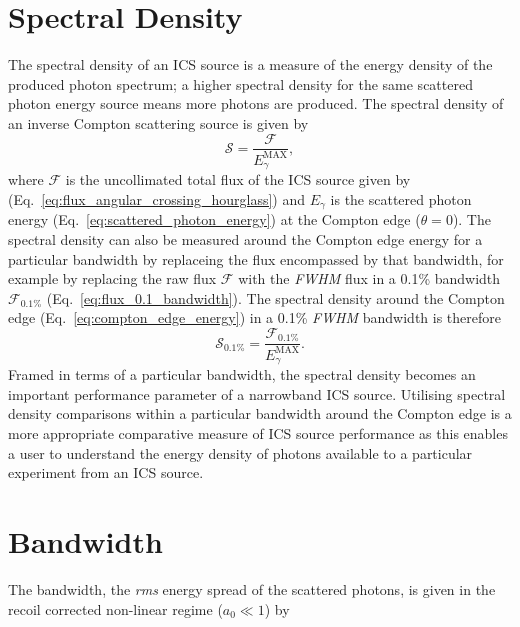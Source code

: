 \documentclass[../main.tex]{subfiles}
\begin{document}
\section{Spectral Density}

The spectral density of an ICS source is a measure of the energy density of the produced photon spectrum; a higher spectral density for the same scattered photon energy source means more photons are produced. The spectral density of an inverse Compton scattering source is given by
\begin{equation}
\mathcal{S} = \frac{\mathcal{F}}{E_{\gamma}^{\mathrm{MAX}}},
\label{eq:spectral_density}    
\end{equation}
where $\mathcal{F}$ is the uncollimated total flux of the ICS source given by (Eq.~\ref{eq:flux_angular_crossing_hourglass}) and $E_{\gamma}$ is the scattered photon energy (Eq.~\ref{eq:scattered_photon_energy}) at the Compton edge ($\theta = 0$). The spectral density can also be measured around the Compton edge energy for a particular bandwidth by replaceing the flux encompassed by that bandwidth, for example by replacing the raw flux $\mathcal{F}$ with the \textit{FWHM} flux in a 0.1\% bandwidth $\mathcal{F_{\mathrm{0.1\%}}}$ (Eq.~\ref{eq:flux_0.1_bandwidth}).
The spectral density around the Compton edge (Eq.~\ref{eq:compton_edge_energy}) in a 0.1\% \textit{FWHM} bandwidth is therefore
\begin{equation}
\mathcal{S}_{\mathrm{0.1\%}} = \frac{\mathcal{F_{\mathrm{0.1\%}}}}{E_{\gamma}^{\mathrm{MAX}}}.
\label{eq:spectral_density_0.1}    
\end{equation}
Framed in terms of a particular bandwidth, the spectral density becomes an important performance parameter of a narrowband ICS source. Utilising spectral density comparisons within a particular bandwidth around the Compton edge is a more appropriate comparative measure of ICS source performance as this enables a user to understand the energy density of photons available to a particular experiment from an ICS source.    

\section{Bandwidth}
\label{sec:bandwidth}

The bandwidth, the \textit{rms} energy spread of the scattered photons, is given in the recoil corrected non-linear regime ($a_{0}\ll 1$) \cite{ranjan2018simulation} by
\end{document}
